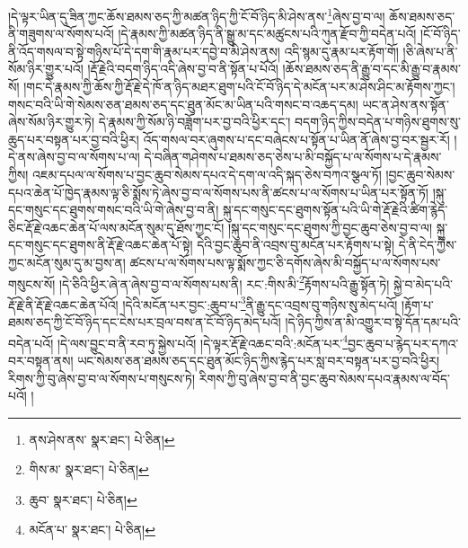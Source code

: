 །དེ་ལྟར་ཡིན་དུ་ཟིན་ཀྱང་ཆོས་ཐམས་ཅད་ཀྱི་མཚན་ཉིད་ཀྱི་ངོ་བོ་ཉིད་མི་ཤེས་ནས་\footnote{ནས་ཤེས་ནས་  སྣར་ཐང་།  པེ་ཅིན། }ཞེས་བྱ་བ་ལ། ཆོས་ཐམས་ཅད་ནི་གཟུགས་ལ་སོགས་པའོ། །དེ་རྣམས་ཀྱི་མཚན་ཉིད་ནི་སྒྱུ་མ་དང་མཚུངས་པའི་ཀུན་རྫོབ་ཀྱི་བདེན་པའོ། །ངོ་བོ་ཉིད་ནི་འོད་གསལ་བ་སྟེ་གཉིས་པོ་དེ་དག་གི་རྣམ་པར་དབྱེ་བ་མི་ཤེས་ནས། འདི་སྙམ་དུ་རྣམ་པར་རྟོག་གོ། །ཅི་ཞེས་པ་ནི་སོམ་ཉིར་གྱུར་པའོ། །རྡོ་རྗེའི་བདག་ཉིད་འདི་ཞེས་བྱ་བ་ནི་སྟོན་པ་པོའོ། །ཆོས་ཐམས་ཅད་ནི་རྒྱུ་བ་དང་མི་རྒྱུ་བ་རྣམས་སོ། །གང་དེ་རྣམས་ཀྱི་ཆོས་ཀྱི་རྡོ་རྗེ་དེ་ཁོ་ན་ཉིད་མཐར་ཐུག་པའི་ངོ་བོ་ཉིད་དེ་མངོན་པར་མ་ཤེས་ཤིང་མ་རྟོགས་ཀྱང་། གསང་བའི་ཡི་གེ་སེམས་ཅན་ཐམས་ཅད་དང་ཐུན་མོང་མ་ཡིན་པའི་གསང་བ་འཆད་དམ། ཡང་ན་ཤེས་ནས་སྟོན་ཞེས་སོམ་ཉིར་གྱུར་ཏེ། དེ་རྣམས་ཀྱི་སོམ་ཉི་བཟློག་པར་བྱ་བའི་ཕྱིར་དང་། བདག་ཉིད་ཀྱིས་བདེན་པ་གཉིས་ཐུགས་སུ་ཆུད་པར་བསྟན་པར་བྱ་བའི་ཕྱིར། འོད་གསལ་བར་ཞུགས་པ་དང་བཞེངས་པ་སྟོན་པ་ཡིན་ནོ་ཞེས་བྱ་བར་སྦྱར་རོ། །དེ་ནས་ཞེས་བྱ་བ་ལ་སོགས་པ་ལ། དེ་བཞིན་གཤེགས་པ་ཐམས་ཅད་ཅེས་པ་མི་བསྐྱོད་པ་ལ་སོགས་པ་དེ་རྣམས་ཀྱིས། འཇམ་དཔལ་ལ་སོགས་པ་བྱང་ཆུབ་སེམས་དཔའ་དེ་དག་ལ་འདི་སྐད་ཅེས་བཀའ་སྩལ་ཏོ། །བྱང་ཆུབ་སེམས་དཔའ་ཆེན་པོ་ཁྱེད་རྣམས་ལྟ་ཅི་སྨོས་ཏེ་ཞེས་བྱ་བ་ལ་སོགས་པས་ནི་ཚངས་པ་ལ་སོགས་པ་ཡིན་པར་སྟོན་ཏོ། །སྐུ་དང་གསུང་དང་ཐུགས་གསང་བའི་ཡི་གེ་ཞེས་བྱ་བ་ནི། སྐུ་དང་གསུང་དང་ཐུགས་སྟོན་པའི་ཡི་གེ་རྡོ་རྗེའི་ཚིག་རྙེད་ཅིང་རྡོ་རྗེ་འཆང་ཆེན་པོ་ལས་མངོན་སུམ་དུ་ཐོས་ཀྱང་ངོ། །སྐུ་དང་གསུང་དང་ཐུགས་ཀྱི་བྱང་ཆུབ་ཅེས་བྱ་བ་ལ། སྐུ་དང་གསུང་དང་ཐུགས་ནི་རྡོ་རྗེ་འཆང་ཆེན་པོ་སྟེ། དེའི་བྱང་ཆུབ་ནི་འབྲས་བུ་མངོན་པར་རྟོགས་པ་སྟེ། དེ་ནི་ངེད་ཀྱིས་ཀྱང་མངོན་སུམ་དུ་མ་བྱས་ན། ཚངས་པ་ལ་སོགས་པས་ལྟ་སྨོས་ཀྱང་ཅི་དགོས་ཞེས་མི་བསྐྱོད་པ་ལ་སོགས་པས་གསུངས་སོ། །དེ་ཅིའི་ཕྱིར་ཞེ་ན་ཞེས་བྱ་བ་ལ་སོགས་པས་ནི། རང་:གིས་མི་\footnote{གིས་མ་  སྣར་ཐང་།  པེ་ཅིན། }རྟོགས་པའི་རྒྱུ་སྟོན་ཏེ། སྐྱེ་བ་མེད་པའི་རྡོ་རྗེ་ནི་རྡོ་རྗེ་འཆང་ཆེན་པོའོ། །དེའི་མངོན་པར་བྱང་:ཆུབ་པ་\footnote{ཆུབ་  སྣར་ཐང་།  པེ་ཅིན། }ནི་རྒྱུ་དང་འབྲས་བུ་གཉིས་སུ་མེད་པའོ། །རྟོག་པ་ཐམས་ཅད་ཀྱི་ངོ་བོ་ཉིད་དང་ངེས་པར་བྲལ་བས་ན་ངོ་བོ་ཉིད་མེད་པའོ། །དེ་ཉིད་ཀྱིས་ན་མི་འགྱུར་བ་སྟེ་དོན་དམ་པའི་བདེན་པའོ། །དེ་ལས་བྱུང་བ་ནི་རབ་ཏུ་སྐྱེས་པའོ། །དེ་ལྟར་རྡོ་རྗེ་འཆང་བའི་:མངོན་པར་\footnote{མངོན་པ་  སྣར་ཐང་།  པེ་ཅིན། }བྱང་ཆུབ་པ་རྙེད་པར་དཀའ་བར་བསྟན་ནས། ཡང་སེམས་ཅན་ཐམས་ཅད་དང་ཐུན་མོང་ཉིད་ཀྱིས་རྙེད་པར་སླ་བར་བསྟན་པར་བྱ་བའི་ཕྱིར། རིགས་ཀྱི་བུ་ཞེས་བྱ་བ་ལ་སོགས་པ་གསུངས་ཏེ། རིགས་ཀྱི་བུ་ཞེས་བྱ་བ་ནི་བྱང་ཆུབ་སེམས་དཔའ་རྣམས་ལ་བོད་པའོ། །
